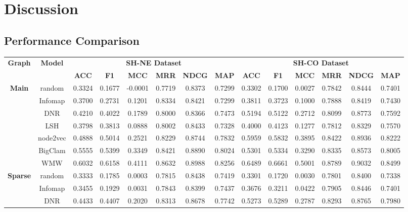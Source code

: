 \section{Discussion}
\subsection{Performance Comparison}
\begin{table}
	
	\centering
	\renewcommand{\tabcolsep}{2.5pt}
	\begin{tabular}{cccccccccccccc} 
		\toprule
		\multirow{2}{*}{ \textbf{Graph}} & 	\multirow{2}{*}{\textbf{Model}}	&\multicolumn{6}{c}{\textbf{SH-NE Dataset}} & \multicolumn{6}{c}{\textbf{SH-CO Dataset}}\\
		\cmidrule(lr){3-14}
		& & \textbf{ACC}& \textbf{F1}& \textbf{MCC}& \textbf{MRR}& \textbf{NDCG}& \textbf{MAP} & \textbf{ACC}& \textbf{F1}& \textbf{MCC} & \textbf{MRR}& \textbf{NDCG}& \textbf{MAP} \\ \midrule 
		\multirow{6}{*}{\textbf{Main }} &random  & 0.3324& 0.1677&-0.0001&0.7719&0.8373&0.7299&0.3302&0.1700&0.0027&0.7842&0.8444&0.7401\\ 
		& Infomap &0.3700& 0.2731&0.1201&0.8334&0.8421&0.7299 &0.3811&0.3723&0.1000&0.7888&0.8419&0.7430\\  
		& DNR &0.4210&0.4022&0.1789&0.8000&0.8366&0.7473&0.5194&0.5122&0.2712&0.8099&0.8773&0.7592\\   
		& LSH &0.3798&0.3813&0.0888&0.8002&0.8433&0.7328&0.4000&0.4123&0.1277&0.7812&0.8329&0.7570\\ 
		& node2vec& 0.4888 &0.5014&0.2521&0.8229&0.8744&0.7832&0.5959&0.5832&0.3895&0.8422&0.8936&0.8222\\   
		& BigClam &0.5555&0.5399&0.3349&0.8421&0.8890&0.8024&0.5301&0.5334&0.3290&0.8335&0.8573&0.8005\\ 
		& WMW &0.6032&0.6158&0.4111&0.8632&0.8988&0.8256&0.6489&0.6661&0.5001&0.8789&0.9032&0.8499\\ \midrule 
		\multirow{6}{*}{\textbf{Sparse}} &random  & 0.3333& 0.1785&0.0003&0.7815&0.8438&0.7419&0.3301&0.1720&0.0030&0.7801&0.8400&0.7338\\ 
		& Infomap &0.3455& 0.1929&0.0031&0.7843&0.8399&0.7437 &0.3676&0.3211&0.0422&0.7905&0.8446&0.7401\\  
		& DNR &0.4433&0.4407&0.2020&0.8313&0.8678&0.7742&0.5273&0.5289&0.2787&0.8293&0.8765&0.7980\\   

\end{tabular}
\end{table}
